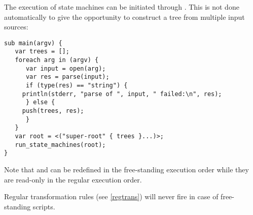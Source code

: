 The execution
of state machines can be initiated through
. This is not
done automatically to give the opportunity to construct a tree from
multiple input sources:

\begin{lstlisting}
sub main(argv) {
   var trees = [];
   foreach arg in (argv) {
      var input = open(arg);
      var res = parse(input);
      if (type(res) == "string") {
	 println(stderr, "parse of ", input, " failed:\n", res);
      } else {
	 push(trees, res);
      }
   }
   var root = <("super-root" { trees }...)>;
   run_state_machines(root);
}
\end{lstlisting}

\noindent
Note that  and  can be redefined in
the free-standing execution order while they are read-only
in the regular execution order.

Regular transformation rules (see \ref{regtrans})
will never fire in case of free-standing scripts.

\endinput
